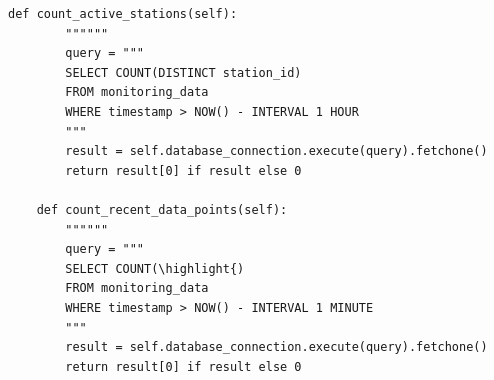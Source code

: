 \begin{lstlisting}[style=python]
    def count_active_stations(self):
        """"""
        query = """
        SELECT COUNT(DISTINCT station_id) 
        FROM monitoring_data 
        WHERE timestamp > NOW() - INTERVAL 1 HOUR
        """
        result = self.database_connection.execute(query).fetchone()
        return result[0] if result else 0
    
    def count_recent_data_points(self):
        """"""
        query = """
        SELECT COUNT(\highlight{) 
        FROM monitoring_data 
        WHERE timestamp > NOW() - INTERVAL 1 MINUTE
        """
        result = self.database_connection.execute(query).fetchone()
        return result[0] if result else 0
\end{lstlisting}

\hypertarget{section-124}{%
\subsubsection{}\label{section-124}}

